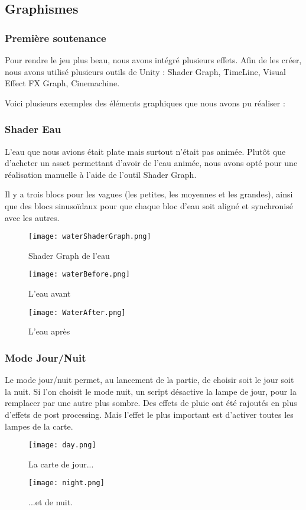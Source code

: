 \subsection{Graphismes}

    \subsubsection{Première soutenance}



Pour rendre le jeu plus beau, nous avons intégré plusieurs effets.
Afin de les créer, nous avons utilisé plusieurs outils de Unity :
Shader Graph, TimeLine, Visual Effect FX Graph, Cinemachine.

Voici plusieurs exemples des éléments graphiques que nous avons pu réaliser : 


\subsubsection{Shader Eau}

L'eau que nous avions était plate mais surtout n'était pas animée.
Plutôt que d'acheter un asset permettant d'avoir de l'eau animée,
nous avons opté pour une réalisation manuelle à l'aide de l'outil Shader Graph.

Il y a trois blocs pour les vagues (les petites, les moyennes et les grandes),
ainsi que des blocs sinusoïdaux pour que chaque bloc d'eau soit aligné et synchronisé avec les autres.
\begin{figure}[hbt!]
    \centering
    \texttt{[image: waterShaderGraph.png]}
    \caption{Shader Graph de l'eau}
\end{figure}
\begin{figure}[hbt!]
    \centering
    \texttt{[image: waterBefore.png]}
    \caption{L'eau avant}
\end{figure}
\begin{figure}[hbt!]
    \centering
    \texttt{[image: WaterAfter.png]}
    \caption{L'eau après}
\end{figure}
\FloatBarrier



\subsubsection{Mode Jour/Nuit}
Le mode jour/nuit permet, au lancement de la partie,
de choisir soit le jour soit la nuit. Si l'on choisit le mode nuit, un script désactive la lampe de jour,
 pour la remplacer par une autre plus sombre. Des effets de pluie ont été rajoutés en plus d'effets de post processing.
Mais l'effet le plus important est d'activer toutes les lampes de la carte.
\begin{figure}[hbt!]
    \centering
    \texttt{[image: day.png]}
    \caption{La carte de jour...}
\end{figure}
\begin{figure}[hbt!]
    \centering

    \texttt{[image: night.png]}
    \caption{...et de nuit.}

\end{figure}
\FloatBarrier

